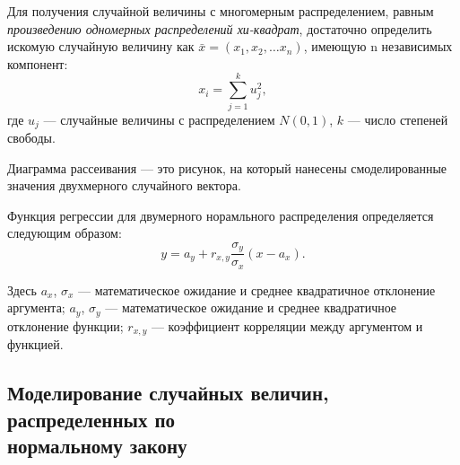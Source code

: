 \newpage

Для получения случайной величины с многомерным распределением, 
равным \textit{произведению одномерных распределений хи-квадрат}, достаточно
определить искомую случайную величину как $ \bar x = (x_1, x_2, \dots x_n) $,
имеющую n независимых компонент:
\begin{equation*}
  x_i = \sum_{j = 1}^{k}{u^{2}_{j}},
\end{equation*}
\noindent где $ u_{j} $ --- случайные величины с распределением $ N(0,1) $,
$ k $ --- число степеней свободы.

Диаграмма рассеивания --- это рисунок, на который нанесены смоделированные значения
двухмерного случайного вектора.

Функция регрессии для двумерного норамльного распределения определяется 
следующим образом:
\begin{equation*}
y = a_y + r_{x,y} \dfrac{\sigma_y}{\sigma_x}(x - a_x).
\end{equation*}

Здесь $ a_x $, $ \sigma_x $ --- математическое ожидание и среднее квадратичное отклонение аргумента;
$ a_y $, $ \sigma_y $ --- математическое ожидание и среднее квадратичное отклонение функции;
$ r_{x,y} $ --- коэффициент корреляции между аргументом и функцией.

\subsection{Моделирование случайных величин, распределенных по \\ нормальному закону}



